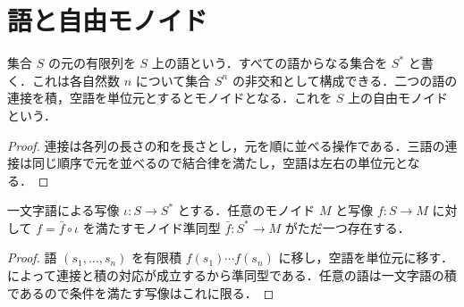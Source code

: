 \section{語と自由モノイド}
\begin{defn}[語と自由モノイド]
集合 $S$ の元の有限列を $S$ 上の語という．すべての語からなる集合を $S^*$ と書く．これは各自然数 $n$ について集合 $S^n$ の非交和として構成できる．二つの語の連接を積，空語を単位元とするとモノイドとなる．これを $S$ 上の自由モノイドという．
\end{defn}
\begin{proof}
連接は各列の長さの和を長さとし，元を順に並べる操作である．三語の連接は同じ順序で元を並べるので結合律を満たし，空語は左右の単位元となる．
\end{proof}
\begin{prop}[自由モノイドの普遍性]
一文字語による写像 $\iota:S\to S^*$ とする．任意のモノイド $M$ と写像 $f:S\to M$ に対して $f=\bar f\circ\iota$ を満たすモノイド準同型 $\bar f:S^*\to M$ がただ一つ存在する．
\end{prop}
\begin{proof}
語 $(s_1,\ldots,s_n)$ を有限積 $f(s_1)\cdots f(s_n)$ に移し，空語を単位元に移す． によって連接と積の対応が成立するから準同型である．任意の語は一文字語の積であるので条件を満たす写像はこれに限る．
\end{proof}
